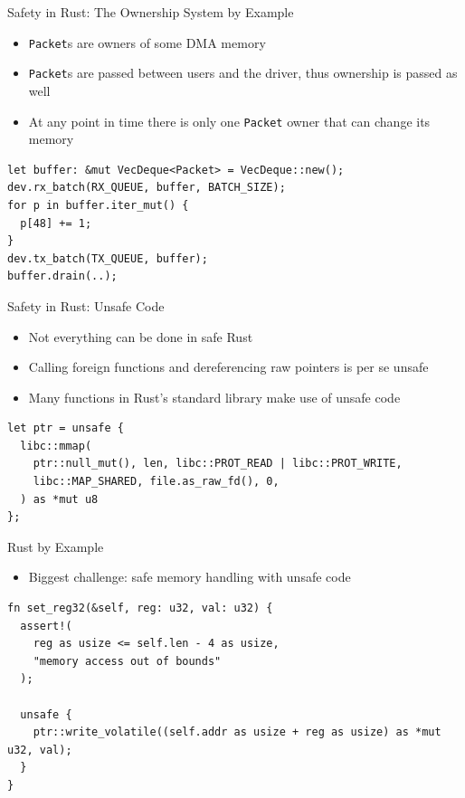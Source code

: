 \documentclass[NET,english,aspectratio=169,notitleframe]{tumbeamer}
\begin{document}
\begin{frame}[fragile]{Safety in Rust: The Ownership System by Example}
\begin{itemize}
\item \texttt{Packet}s are owners of some DMA memory
\item \texttt{Packet}s are passed between users and the driver, thus ownership is passed as well
\item At any point in time there is only one \texttt{Packet} owner that can change its memory
\end{itemize}
\begin{verbatim}
let buffer: &mut VecDeque<Packet> = VecDeque::new();
dev.rx_batch(RX_QUEUE, buffer, BATCH_SIZE);
for p in buffer.iter_mut() {
  p[48] += 1;
}
dev.tx_batch(TX_QUEUE, buffer);
buffer.drain(..);
\end{verbatim}
\end{frame}

\begin{frame}[fragile]{Safety in Rust: Unsafe Code}
\begin{itemize}
\item Not everything can be done in safe Rust
\item Calling foreign functions and dereferencing raw pointers is per se unsafe
\item Many functions in Rust's standard library make use of unsafe code
\end{itemize}
\begin{verbatim}
let ptr = unsafe {
  libc::mmap(
    ptr::null_mut(), len, libc::PROT_READ | libc::PROT_WRITE,
    libc::MAP_SHARED, file.as_raw_fd(), 0,
  ) as *mut u8
};
\end{verbatim}
\end{frame}

\begin{frame}[fragile]{Rust by Example}
\begin{itemize}
\item Biggest challenge: safe memory handling with unsafe code
\end{itemize}
\begin{verbatim}
fn set_reg32(&self, reg: u32, val: u32) {
  assert!(
    reg as usize <= self.len - 4 as usize,
    "memory access out of bounds"
  );

  unsafe {
    ptr::write_volatile((self.addr as usize + reg as usize) as *mut u32, val);
  }
}
\end{verbatim}
\end{frame}
\end{document}
